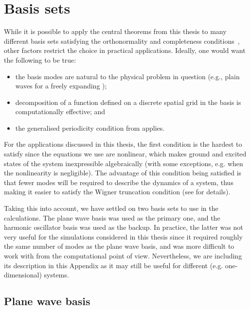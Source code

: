 \chapter{Basis sets}
\label{cha:appendix:bases}

While it is possible to apply the central theorems from this thesis to many different basis sets satisfying the orthonormality and completeness conditions~, other factors restrict the choice in practical applications.
Ideally, one would want the following to be true:
\begin{itemize}
    \item the basis modes are natural to the physical problem in question (e.g., plain waves for a freely expanding );
    \item decomposition of a function defined on a discrete spatial grid in the basis is computationally effective; and
    \item the generalised periodicity condition from  applies.
\end{itemize}

For the applications discussed in this thesis, the first condition is the hardest to satisfy since the equations we use are nonlinear, which makes ground and excited states of the system inexpressible algebraically (with some exceptions, e.g. when the nonlinearity is negligible).
The advantage of this condition being satisfied is that fewer modes will be required to describe the dynamics of a system, thus making it easier to satisfy the Wigner truncation condition (see  for details).

Taking this into account, we have settled on two basis sets to use in the calculations.
The plane wave basis was used as the primary one, and the harmonic oscillator basis was used as the backup.
In practice, the latter was not very useful for the simulations considered in this thesis since it required roughly the same number of modes as the plane wave basis, and was more difficult to work with from the computational point of view.
Nevertheless, we are including its description in this Appendix as it may still be useful for different (e.g. one-dimensional) systems.


\section{Plane wave basis}

